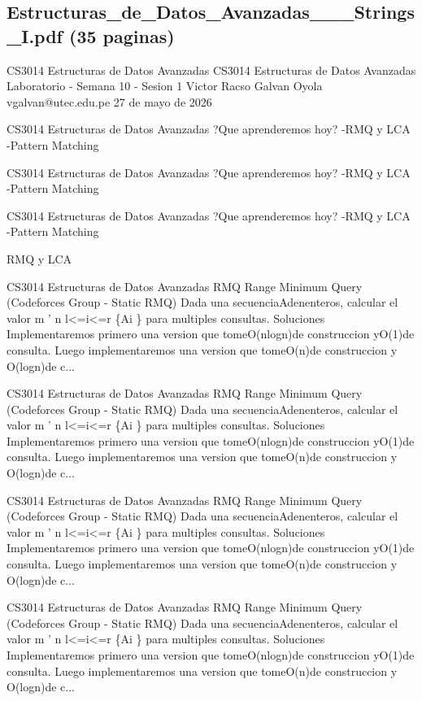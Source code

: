 \subsection*{Estructuras\_de\_Datos\_Avanzadas\_\_\_Strings\_I.pdf (35 paginas)}
\begin{description}[leftmargin=!,labelwidth=4.2em,style=nextline]
\item[Pag. 1] CS3014 Estructuras de Datos Avanzadas CS3014 Estructuras de Datos Avanzadas Laboratorio - Semana 10 - Sesion 1 Victor Racso Galvan Oyola vgalvan@utec.edu.pe 27 de mayo de 2026
\item[Pag. 2] CS3014 Estructuras de Datos Avanzadas ?Que aprenderemos hoy? -RMQ y LCA -Pattern Matching
\item[Pag. 3] CS3014 Estructuras de Datos Avanzadas ?Que aprenderemos hoy? -RMQ y LCA -Pattern Matching
\item[Pag. 4] CS3014 Estructuras de Datos Avanzadas ?Que aprenderemos hoy? -RMQ y LCA -Pattern Matching
\item[Pag. 5] RMQ y LCA
\item[Pag. 6] CS3014 Estructuras de Datos Avanzadas RMQ Range Minimum Query (Codeforces Group - Static RMQ) Dada una secuenciaAdenenteros, calcular el valor m '  n l<=i<=r \{Ai \} para multiples consultas. Soluciones Implementaremos primero una version que tomeO(nlogn)de construccion yO(1)de consulta. Luego implementaremos una version que tomeO(n)de construccion y O(logn)de c...
\item[Pag. 7] CS3014 Estructuras de Datos Avanzadas RMQ Range Minimum Query (Codeforces Group - Static RMQ) Dada una secuenciaAdenenteros, calcular el valor m '  n l<=i<=r \{Ai \} para multiples consultas. Soluciones Implementaremos primero una version que tomeO(nlogn)de construccion yO(1)de consulta. Luego implementaremos una version que tomeO(n)de construccion y O(logn)de c...
\item[Pag. 8] CS3014 Estructuras de Datos Avanzadas RMQ Range Minimum Query (Codeforces Group - Static RMQ) Dada una secuenciaAdenenteros, calcular el valor m '  n l<=i<=r \{Ai \} para multiples consultas. Soluciones Implementaremos primero una version que tomeO(nlogn)de construccion yO(1)de consulta. Luego implementaremos una version que tomeO(n)de construccion y O(logn)de c...
\item[Pag. 9] CS3014 Estructuras de Datos Avanzadas RMQ Range Minimum Query (Codeforces Group - Static RMQ) Dada una secuenciaAdenenteros, calcular el valor m '  n l<=i<=r \{Ai \} para multiples consultas. Soluciones Implementaremos primero una version que tomeO(nlogn)de construccion yO(1)de consulta. Luego implementaremos una version que tomeO(n)de construccion y O(logn)de c...

\end{description}
